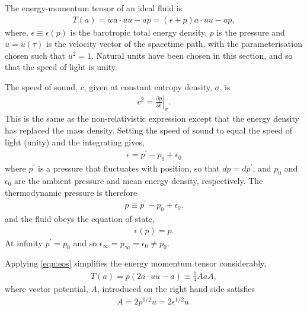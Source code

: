 \documentclass[10pt, fleqn,draft,showtrims,oldfontcommands]{article} %
\newcommand{\eqal}[2]{\begin{align}#1\label{eqn:#2}\end{align}}
\newcommand{\eqnref}[1]{\ref{eqn:#1}}
\newcommand{\epsillon}{\epsilon}
\newcommand{\lr}[1]{\left( #1 \right)}
\renewcommand{\d}{\partial}
\newcommand{\given}[2]{ \left.{#1}\right|_{#2}  }
\begin{document}
The energy-momentum tensor of an ideal fluid is\cite{Doran2003}
\eqal{
  T(a) = w a \cdot u u - a p = (\epsilon + p) a \cdot u u - a p,
}{EMtensor}
where, $\epsilon \equiv \epsilon(p)$ is the barotropic total energy density,
$p$ is the pressure
and 
$u=u(\tau)$ is the velocity vector of the spacetime path, with the parameterisation chosen such that $u^2 = 1$. %
Natural units have been chosen in this section, and so that the speed of light is unity.

The speed of sound, $c$,  given at constant entropy density, $\sigma$, is\cite{LandauBook,Taub1978} 
\begin{align}
  c^2 = \given{\frac{\d p}{\d \epsillon}}{\sigma}. \label{eqn:soundspeed}
\end{align}
This is the same as the non-relativistic expression except that the energy density has replaced the mass density.
Setting the speed of sound to equal the speed of light (unity) and the integrating 
 gives,
 \begin{align}
   \epsilon = p^\prime - p_0 + \epsilon_0
 \end{align} 
where $p^\prime$ is a pressure that fluctuates with position, so that $dp = dp^\prime$,
and $p_0$  and $\epsilon_0$  are the ambient  pressure and mean energy density, respectively.
The thermodynamic pressure is therefore
\begin{align}
  p \equiv p^\prime - p_0 + \epsilon_0. \label{eqn:pshort}
\end{align}
and the fluid obeys the equation of state, 
\eqal{
  \epsilon(p) = p.
}{eos}
At infinity $p^\prime = p_0$ 
and so $\epsilon_\infty = p_\infty = \epsilon_0 \ne p_0$.




Applying \eqnref{eos} simplifies the energy momentum tensor considerably,
\eqal{
  T(a) =  p\lr{2 a \cdot u u  - a} \equiv  \frac{1}{4}  A a A,
}{EMFluid}
where vector potential, $A$, introduced on the right hand side satisfies
\eqal{
  A = 2p^{1/2}u =2 \epsilon^{1/2} u.
}{defnA}
\end{document}
